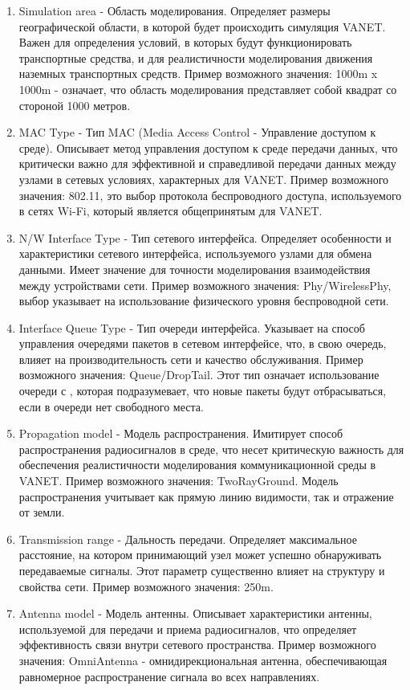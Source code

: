 \begin{enumerate}
  \item Simulation area - Область моделирования. Определяет размеры географической области, в которой будет происходить симуляция VANET. Важен для определения условий, в которых будут функционировать транспортные средства, и для реалистичности моделирования движения наземных транспортных средств. Пример возможного значения: 1000m x 1000m - означает, что область моделирования представляет собой квадрат со стороной 1000 метров.
  \item MAC Type - Тип MAC (Media Access Control - Управление доступом к среде). Описывает метод управления доступом к среде передачи данных, что критически важно для эффективной и справедливой передачи данных между узлами в сетевых условиях, характерных для VANET. Пример возможного значения: 802.11, это выбор протокола беспроводного доступа, используемого в сетях Wi-Fi, который является общепринятым для VANET.
  \item N/W Interface Type - Тип сетевого интерфейса. Определяет особенности и характеристики сетевого интерфейса, используемого узлами для обмена данными. Имеет значение для точности моделирования взаимодействия между устройствами сети. Пример возможного значения: Phy/WirelessPhy, выбор указывает на использование физического уровня беспроводной сети.
  \item Interface Queue Type - Тип очереди интерфейса. Указывает на способ управления очередями пакетов в сетевом интерфейсе, что, в свою очередь, влияет на производительность сети и качество обслуживания. Пример возможного значения: Queue/DropTail. Этот тип означает использование очереди с , которая подразумевает, что новые пакеты будут отбрасываться, если в очереди нет свободного места.
  \item Propagation model - Модель распространения. Имитирует способ распространения радиосигналов в среде, что несет критическую важность для обеспечения реалистичности моделирования коммуникационной среды в VANET. Пример возможного значения: TwoRayGround. Модель распространения  учитывает как прямую линию видимости, так и отражение от земли.
  \item Transmission range - Дальность передачи. Определяет максимальное расстояние, на котором принимающий узел может успешно обнаруживать передаваемые сигналы. Этот параметр существенно влияет на структуру и свойства сети. Пример возможного значения: 250m.
  \item Antenna model - Модель антенны. Описывает характеристики антенны, используемой для передачи и приема радиосигналов, что определяет эффективность связи внутри сетевого пространства. Пример возможного значения: OmniAntenna - омнидирекциональная антенна, обеспечивающая равномерное распространение сигнала во всех направлениях.

\end{enumerate}
